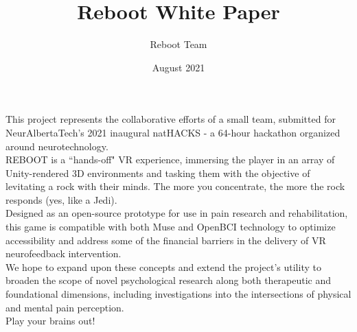 \documentclass[12pt]{article}
\title{Reboot White Paper}
\author{Reboot Team}
\date{August 2021}
\begin{document}
\maketitle

\noindent This project represents the collaborative efforts of a small team, submitted for NeurAlbertaTech’s 2021 inaugural natHACKS - a 64-hour hackathon organized around neurotechnology.\\


\noindent REBOOT is a ``hands-off" VR experience, immersing the player in an array of Unity-rendered 3D environments and tasking them with the objective of levitating a rock with their minds. The more you concentrate, the more the rock responds (yes, like a Jedi).\\


\noindent Designed as an open-source prototype for use in pain research and rehabilitation, this game is compatible with both Muse and OpenBCI technology to optimize accessibility and address some of the financial barriers in the delivery of VR neurofeedback intervention.\\


\noindent We hope to expand upon these concepts and extend the project’s utility to broaden the scope of novel psychological research along both therapeutic and foundational dimensions, including investigations into the intersections of physical and mental pain perception.\\


\noindent Play your brains out!
\end{document}
